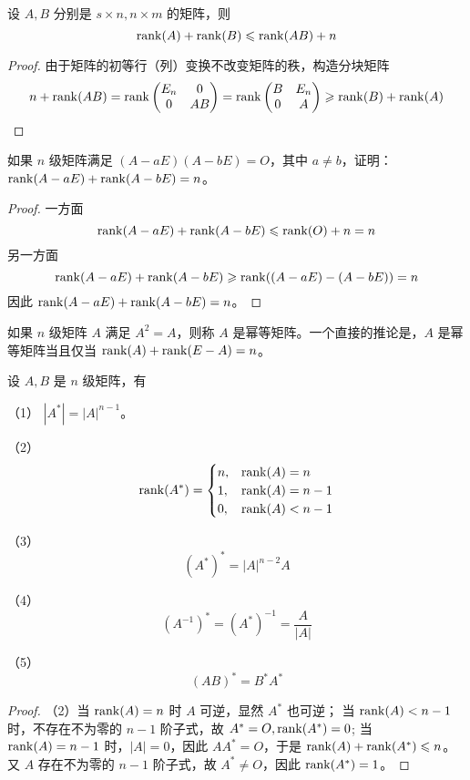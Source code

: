 \begin{theorem}
	设 $A, B$ 分别是 $s \times n, n \times m$ 的矩阵，则
	\[ \operatorname{rank}(A) + \operatorname{rank}(B) \leqslant \operatorname{rank}(AB) + n \]
\end{theorem}

\begin{proof}
	由于矩阵的初等行（列）变换不改变矩阵的秩，构造分块矩阵
	\[ n + \operatorname{rank}(AB) = \operatorname{rank} \left(\begin{matrix}
				E_n & 0 \\ 0 & AB
			\end{matrix}\right) = \operatorname{rank}\left(\begin{matrix}
				B & E_n \\ 0 & A
			\end{matrix}\right) \geqslant \operatorname{rank}(B) + \operatorname{rank}(A) \]
\end{proof}

\begin{theorem}
	如果 $n$ 级矩阵满足 $(A - aE)(A - bE) = O$，其中 $a \neq b$，证明：$\operatorname{rank}(A - aE) + \operatorname{rank}(A - bE) = n$。
\end{theorem}

\begin{proof}
	一方面
	\[ \operatorname{rank}(A - aE) + \operatorname{rank}(A - bE) \leqslant \operatorname{rank}(O) + n = n \]
	另一方面
	\[ \operatorname{rank}(A - aE) + \operatorname{rank}(A - bE) \geqslant \operatorname{rank}((A - aE) - (A - bE)) = n \]
	因此 $\operatorname{rank}(A - aE) + \operatorname{rank}(A - bE) = n$。
\end{proof}

如果 $n$ 级矩阵 $A$ 满足 $A^2 = A$，则称 $A$ 是幂等矩阵。一个直接的推论是，$A$ 是幂等矩阵当且仅当 $\operatorname{rank}(A) + \operatorname{rank}(E - A) = n$。

\begin{example}
	设 $A, B$ 是 $n$ 级矩阵，有
	
	（1） $|A^*| = |A|^{n-1}$。
	
	（2） \[ \operatorname{rank}(A^*) = \begin{cases}
			n, & \operatorname{rank}(A) = n      \\
			1, & \operatorname{rank}(A) = n - 1  \\
			0, & \operatorname{rank}(A) < n - 1
		\end{cases} \]
	
	（3）\[ (A^*)^* = |A|^{n-2} A \]
	
	（4）\[ (A^{-1})^{*} = (A^*)^{-1} = \frac{A}{|A|} \]
	
	（5）\[ (AB)^* = B^*A^* \]
\end{example}

\begin{proof}
	（2）当 $\operatorname{rank}(A) = n$ 时 $A$ 可逆，显然 $A^*$ 也可逆；
	当 $\operatorname{rank}(A) < n - 1$ 时，不存在不为零的 $n-1$ 阶子式，故 $A^* = O, \operatorname{rank}(A^*) = 0$;
	当 $\operatorname{rank}(A) = n - 1$ 时，$|A| = 0$，因此 $A A^* = O$，于是 $\operatorname{rank}(A) + \operatorname{rank}(A^*) \leqslant n$。又 $A$ 存在不为零的 $n-1$ 阶子式，故 $A^* \neq O$，因此 $\operatorname{rank}(A^*) = 1$。 
\end{proof}

